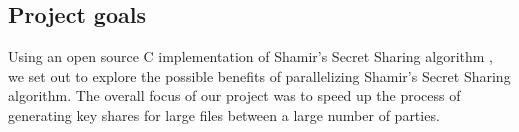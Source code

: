\documentclass[main.tex]{subfiles}
\begin{document}

\subsection{Project goals}

\indent Using an open source C implementation of Shamir's Secret Sharing algorithm \cite{one}, we set out to explore the possible benefits of parallelizing Shamir's Secret Sharing algorithm.  The overall focus of our project was to speed up the process of generating key shares for large files between a large number of parties.

\end{document}
